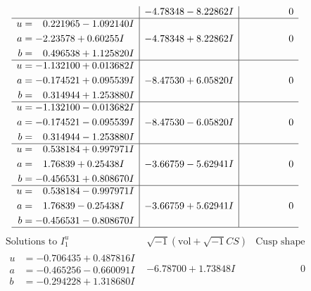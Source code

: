 \documentclass[1p]{elsarticle_modified}
\theoremstyle{definition}
\newcommand{\I}{\sqrt{-1}}
\begin{document}
$$\begin{array}{c|c|c}
 & -4.78348 - 8.22862 I & \phantom{-0.000000 } 0 \\ \hline\begin{aligned}
u &= \phantom{-}0.221965 - 1.092140 I \\
a &= -2.23578 + 0.60255 I \\
b &= \phantom{-}0.496538 + 1.125820 I\end{aligned}
 & -4.78348 + 8.22862 I & \phantom{-0.000000 } 0 \\ \hline\begin{aligned}
u &= -1.132100 + 0.013682 I \\
a &= -0.174521 + 0.095539 I \\
b &= \phantom{-}0.314944 + 1.253880 I\end{aligned}
 & -8.47530 + 6.05820 I & \phantom{-0.000000 } 0 \\ \hline\begin{aligned}
u &= -1.132100 - 0.013682 I \\
a &= -0.174521 - 0.095539 I \\
b &= \phantom{-}0.314944 - 1.253880 I\end{aligned}
 & -8.47530 - 6.05820 I & \phantom{-0.000000 } 0 \\ \hline\begin{aligned}
u &= \phantom{-}0.538184 + 0.997971 I \\
a &= \phantom{-}1.76839 + 0.25438 I \\
b &= -0.456531 + 0.808670 I\end{aligned}
 & -3.66759 - 5.62941 I & \phantom{-0.000000 } 0 \\ \hline\begin{aligned}
u &= \phantom{-}0.538184 - 0.997971 I \\
a &= \phantom{-}1.76839 - 0.25438 I \\
b &= -0.456531 - 0.808670 I\end{aligned}
 & -3.66759 + 5.62941 I & \phantom{-0.000000 } 0\\
 \hline 
 \end{array}$$\newpage$$\begin{array}{c|c|c}  
\text{Solutions to }I^u_{1}& \I (\text{vol} + \sqrt{-1}CS) & \text{Cusp shape}\\
 \hline 
\begin{aligned}
u &= -0.706435 + 0.487816 I \\
a &= -0.465256 - 0.660091 I \\
b &= -0.294228 + 1.318680 I\end{aligned}
 & -6.78700 + 1.73848 I & \phantom{-0.000000 } 0 \\ \hline\begin{aligned}

\end{aligned}
\end{array}$$
\end{document}
